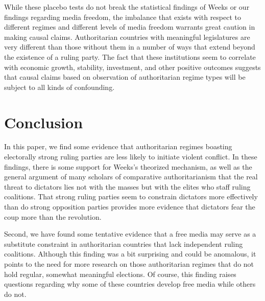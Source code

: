 \documentclass[12pt]{article}
\begin{document}
\par While these placebo tests do not break the statistical findings of Weeks or our findings regarding media freedom, the imbalance that exists with respect to different regimes and different levels of media freedom warrants great caution in making causal claims. Authoritarian countries with meaningful legislatures are very different than those without them in a number of ways that extend beyond the existence of a ruling party. The fact that these institutions seem to correlate with economic growth, stability, investment, and other positive outcomes suggests that causal claims based on observation of authoritarian regime types will be subject to all kinds of confounding.  

\section{Conclusion}

\par In this paper, we find some evidence that authoritarian regimes boasting electorally strong ruling parties are less likely to initiate violent conflict. In these findings, there is some support for Weeks's theorized mechanism, as well as the general argument of many scholars of comparative authoritarianism that the real threat to dictators lies not with the masses but with the elites who staff ruling coalitions. That strong ruling parties seem to constrain dictators more effectively than do strong opposition parties provides more evidence that dictators fear the coup more than the revolution.

\par Second, we have found some tentative evidence that a free media may serve as a substitute constraint in authoritarian countries that lack independent ruling coalitions. Although this finding was a bit surprising and could be anomalous, it points to the need for more research on those authoritarian regimes that do not hold regular, somewhat meaningful elections. Of course, this finding raises questions regarding why some of these countries develop free media while others do not. 
\end{document}
